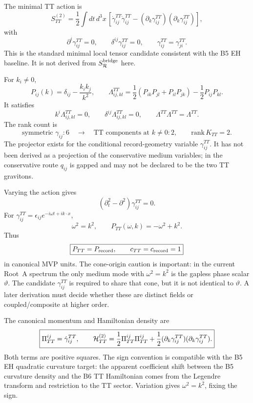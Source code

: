 \documentclass[11pt]{article}
\begin{document}
The minimal TT action is
\[
\boxed{
S_{TT}^{(2)}
=\frac12\int dt\,d^3x\,
\left[
\dot\gamma^{TT}_{ij}\dot\gamma^{TT}_{ij}
-(\partial_k\gamma^{TT}_{ij})(\partial_k\gamma^{TT}_{ij})
\right],
}
\]
with
\[
\boxed{
\partial^i\gamma^{TT}_{ij}=0,\qquad
\delta^{ij}\gamma^{TT}_{ij}=0,\qquad
\gamma^{TT}_{ij}=\gamma^{TT}_{ji}.
}
\]
This is the standard minimal local tensor candidate consistent with the B5
EH baseline.  It is not derived from \(S_{\mathcal R}^{\rm bridge}\) here.

For \(k_i\ne0\),
\[
\boxed{
P_{ij}(k)=\delta_{ij}-\frac{k_ik_j}{k^2},
\qquad
\Lambda^{TT}_{ij,kl}
=\frac12(P_{ik}P_{jl}+P_{il}P_{jk})-\frac12P_{ij}P_{kl}.
}
\]
It satisfies
\[
\boxed{
k^i\Lambda^{TT}_{ij,kl}=0,\qquad
\delta^{ij}\Lambda^{TT}_{ij,kl}=0,\qquad
\Lambda^{TT}\Lambda^{TT}=\Lambda^{TT}.
}
\]
The rank count is
\[
\boxed{
\text{symmetric }\gamma_{ij}:6\quad\to\quad
\text{TT components at }k\ne0:2,
\qquad \mathrm{rank}\,K_{TT}=2.
}
\]
The projector exists for the conditional record-geometry variable
\(\gamma^{TT}_{ij}\).  It has not been derived as a projection of the
conservative medium variables; in the conservative route \(q_{ij}\) is gapped
and may not be declared to be the two TT gravitons.

Varying the action gives
\[
\boxed{(\partial_t^2-\partial^2)\gamma^{TT}_{ij}=0.}
\]
For \(\gamma^{TT}_{ij}=\epsilon_{ij}e^{-i\omega t+i k\cdot x}\),
\[
\boxed{\omega^2=k^2,\qquad P_{TT}(\omega,k)=-\omega^2+k^2.}
\]
Thus
\[
\boxed{P_{TT}=P_{\rm record},\qquad c_{TT}=c_{\rm record}=1}
\]
in canonical MVP units.  The cone-origin caution is important: in the current
Root~A spectrum the only medium mode with \(\omega^2=k^2\) is the gapless
phase scalar \(\vartheta\).  The candidate \(\gamma^{TT}_{ij}\) is required to
share that cone, but it is not identical to \(\vartheta\).  A later derivation
must decide whether these are distinct fields or coupled/composite at higher
order.

The canonical momentum and Hamiltonian density are
\[
\boxed{
\Pi^{ij}_{TT}=\dot\gamma^{TT}_{ij},\qquad
{\cal H}^{(2)}_{TT}
=\frac12\Pi^{ij}_{TT}\Pi^{ij}_{TT}
+\frac12(\partial_k\gamma^{TT}_{ij})(\partial_k\gamma^{TT}_{ij}).
}
\]
Both terms are positive squares.  The sign convention is compatible with the
B5 EH quadratic curvature target: the apparent coefficient shift between the
B5 curvature density and the B6 TT Hamiltonian comes from the Legendre
transform and restriction to the TT sector.  Variation gives
\(\omega^2=k^2\), fixing the sign.
\end{document}
